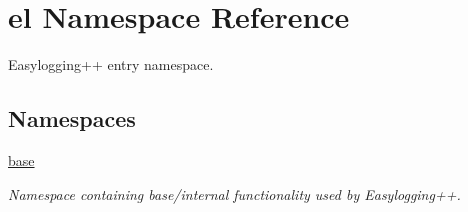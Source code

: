 \hypertarget{namespaceel}{}\section{el Namespace Reference}
\label{namespaceel}


Easylogging++ entry namespace.  


\subsection*{Namespaces}
\begin{DoxyCompactItemize}
\item 
 \hyperlink{namespaceel_1_1base}{base}
\begin{DoxyCompactList}\small\item\em Namespace containing base/internal functionality used by Easylogging++. \end{DoxyCompactList}\end{DoxyCompactItemize}
